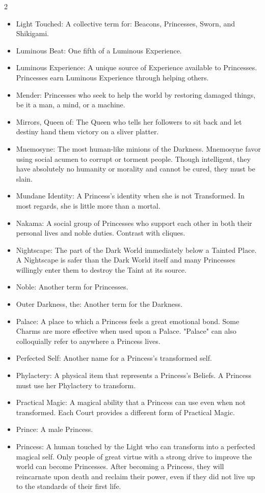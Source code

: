 \begin{multicols}{2}
\begin{itemize}
  \item Light Touched: A collective term for: Beacons, Princesses, Sworn, and Shikigami.
  \item Luminous Beat: One fifth of a Luminous Experience. 
  \item Luminous Experience: A unique source of Experience available to Princesses. Princesses earn Luminous Experience through helping others.
  \item Mender: Princesses who seek to help the world by restoring damaged things, be it a man, a mind, or a machine.
  \item Mirrors, Queen of: The Queen who tells her followers to sit back and let destiny hand them victory on a sliver platter.  
  \item Mnemosyne: The most human-like minions of the Darkness. Mnemosyne favor using social acumen to corrupt or torment people. Though intelligent, they have absolutely no humanity or morality and cannot be cured, they must be slain. 
  \item Mundane Identity: A Princess's identity when she is not Transformed. In most regards, she is little more than a mortal. 
  \item Nakama: A social group of Princesses who support each other in both their personal lives and noble duties. Contrast with cliques. 
  \item Nightscape: The part of the Dark World immediately below a Tainted Place. A Nightscape is safer than the Dark World itself and many Princesses willingly enter them to destroy the Taint at its source. 
  \item Noble: Another term for Princesses. 
  \item Outer Darkness, the: Another term for the Darkness. 
  \item Palace: A place to which a Princess feels a great emotional bond. Some Charms are more effective when used upon a Palace. "Palace" can also colloquially refer to anywhere a Princess lives. 
  \item Perfected Self: Another name for a Princess's transformed self. 
  \item Phylactery: A physical item that represents a Princess's Beliefs. A Princess must use her Phylactery to transform. 
  \item Practical Magic: A magical ability that a Princess can use even when not transformed. Each Court provides a different form of Practical Magic. 
  \item Prince: A male Princess. 
  \item Princess: A human touched by the Light who can transform into a perfected magical self. Only people of great virtue with a strong drive to improve the world can become Princesses. After becoming a Princess, they will reincarnate upon death and reclaim their power, even if they did not live up to the standards of their first life.

\end{itemize}
\end{multicols}
